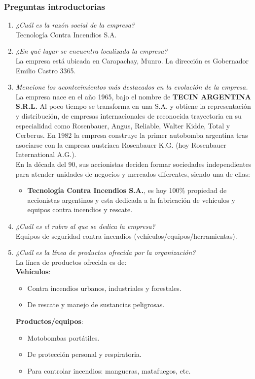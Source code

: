 \documentclass[a4paper,10pt]{article}
\begin{document}
		\subsubsection{Preguntas introductorias}
			\begin{enumerate}
				\item \textit{¿Cuál es la razón social de la empresa?}\\
				Tecnología Contra Incendios S.A.
				
				\item \textit{¿En qué lugar se encuentra localizada la empresa?}\\
				La empresa está ubicada en Carapachay, Munro. La dirección es Gobernador Emilio Castro 3365.			
				
				\item \textit{Mencione los acontecimientos más destacados en la evolución de la empresa.}\\
				La empresa nace en el año 1965, bajo el nombre de \textbf{TECIN ARGENTINA S.R.L.} Al poco tiempo se transforma en una S.A. y obtiene la representación y distribución, de empresas internacionales de reconocida trayectoria en su especialidad como Rosenbauer, Angus, Reliable, Walter Kidde, Total y Cerberus. En 1982 la empresa construye la primer autobomba argentina tras asociarse con la empresa austriaca Rosenbauer K.G. (hoy Rosenbauer International A.G.).\\
				En la década del 90, sus accionistas deciden formar sociedades independientes para atender unidades de negocios y mercados diferentes, siendo una de ellas: 
				\begin{itemize}
					\item \textbf{Tecnología Contra Incendios S.A.}, es hoy 100\% propiedad de accionistas argentinos y esta dedicada a la fabricación de vehículos y equipos contra incendios y rescate.
				\end{itemize}
				\item \textit{¿Cuál es el rubro al que se dedica la empresa?}\\
				Equipos de seguridad contra incendios (vehículos/equipos/herramientas).
			
				\item \textit{¿Cuál es la línea de productos ofrecida por la organización?}\\	
				La línea de productos ofrecida es de:\\
				\textbf{Vehículos}:
				\begin{itemize}
					\item Contra incendios urbanos, industriales y forestales.
					\item De rescate y manejo de sustancias peligrosas.
				\end{itemize}
				\textbf{Productos/equipos}:
				\begin{itemize}
					\item Motobombas portátiles.
					\item De protección personal y respiratoria.
					\item Para controlar incendios: mangueras, matafuegos, etc.
				\end{itemize}	
												

\end{enumerate}
\end{document}
